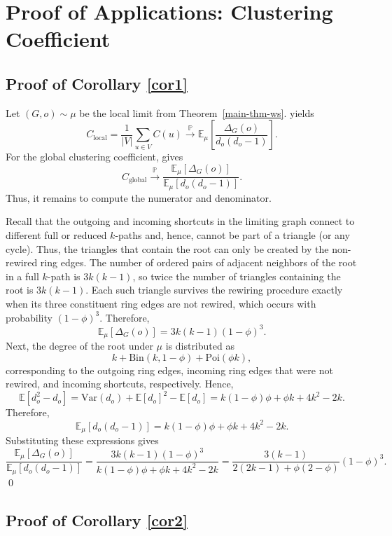 \documentclass[10pt]{amsart}
\begin{document}
\section{Proof of Applications: Clustering Coefficient} \label{proof-applications-cluster}

\subsection*{Proof of Corollary \ref{cor1}}

Let \((G,o)\sim \mu\) be the local limit from Theorem~\ref{main-thm-ws}.  \cite[Theorem~2.23]{remco} yields
\[
C_{\mathrm{local}}
=\frac{1}{|V|}\sum_{u\in V} C(u)
\xrightarrow{\mathbb P}
\mathbb E_{\mu}\left[\frac{\Delta_G(o)}{d_o(d_o-1)}\right].
\]
For the global clustering coefficient,  \cite[Theorem~2.22]{remco} gives
\[
C_{\mathrm{global}} \xrightarrow{\mathbb P} \frac{\mathbb E_{\mu}[\Delta_G(o)]}{\mathbb E_{\mu}[d_o(d_o - 1)]}.
\]
Thus, it remains to compute the numerator and denominator.

Recall that the outgoing and incoming shortcuts in the limiting graph connect to different full or reduced \(k\)-paths and, hence, cannot be part of a triangle (or any cycle). Thus, the triangles that contain the root can only be created by the non-rewired ring edges. The number of ordered pairs of adjacent neighbors of the root in a full \(k\)-path is \(3k(k-1)\), so twice the number of triangles containing the root is \(3k(k-1)\). Each such triangle survives the rewiring procedure exactly when its three constituent ring edges are not rewired, which occurs with probability \((1-\phi)^3\). Therefore,
\[
\mathbb E_{\mu}[\Delta_G(o)] = 3k(k-1)(1-\phi)^3.
\]
Next, the degree of the root under \(\mu\) is distributed as
\[
k+ \mathrm{Bin}(k,1-\phi) + \mathrm{Poi}(\phi k),
\]
corresponding to the outgoing ring edges, incoming ring edges that were not rewired, and incoming shortcuts, respectively. Hence,
\[
\mathbb{E}[d_o^2 - d_o]
= \mathrm{Var}(d_o) + \mathbb{E}[d_o]^2 - \mathbb{E}[d_o]
= k(1-\phi)\phi + \phi k + 4k^2 - 2k.
\]
Therefore,
\[
\mathbb E_{\mu}[d_o(d_o-1)] = k(1-\phi)\phi + \phi k + 4k^2 - 2k.
\]
Substituting these expressions gives
\[
\frac{\mathbb E_{\mu}[\Delta_G(o)]}{\mathbb E_{\mu}[d_o(d_o-1)]}
=
\frac{3k(k-1)(1-\phi)^3}{k(1-\phi)\phi + \phi k + 4k^2 - 2k}
=
\frac{3(k-1)}{2(2k-1) + \phi (2 - \phi)} (1-\phi)^3.
\]
\qed

\subsection*{Proof of Corollary \ref{cor2}}
\end{document}
